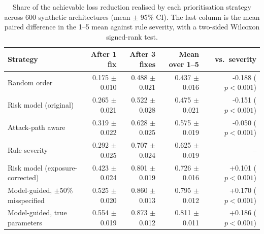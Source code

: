 \begin{table}[t]
\centering
\caption{Share of the achievable loss reduction realised by each prioritisation strategy across 600 synthetic architectures (mean $\pm$ 95\% CI). The last column is the mean paired difference in the 1--5 mean against rule severity, with a two-sided Wilcoxon signed-rank test.}
\label{tab:main}
\small
\setlength{\tabcolsep}{4pt}
\begin{tabular}{lrrrr}
\toprule
Strategy & After 1 fix & After 3 fixes & Mean over 1--5 & vs.~severity \\
\midrule
Random order & 0.175 $\pm$ 0.010 & 0.488 $\pm$ 0.021 & 0.437 $\pm$ 0.016 & -0.188 ($p<0.001$) \\
Risk model (original) & 0.265 $\pm$ 0.021 & 0.522 $\pm$ 0.028 & 0.475 $\pm$ 0.021 & -0.151 ($p<0.001$) \\
Attack-path aware & 0.319 $\pm$ 0.022 & 0.628 $\pm$ 0.025 & 0.575 $\pm$ 0.019 & -0.050 ($p<0.001$) \\
Rule severity & 0.292 $\pm$ 0.025 & 0.707 $\pm$ 0.024 & 0.625 $\pm$ 0.019 & -- \\
Risk model (exposure-corrected) & 0.423 $\pm$ 0.024 & 0.801 $\pm$ 0.019 & 0.726 $\pm$ 0.016 & +0.101 ($p<0.001$) \\
Model-guided, $\pm$50\% misspecified & 0.525 $\pm$ 0.020 & 0.860 $\pm$ 0.013 & 0.795 $\pm$ 0.012 & +0.170 ($p<0.001$) \\
Model-guided, true parameters & 0.554 $\pm$ 0.019 & 0.873 $\pm$ 0.012 & 0.811 $\pm$ 0.011 & +0.186 ($p<0.001$) \\
\bottomrule
\end{tabular}
\end{table}
